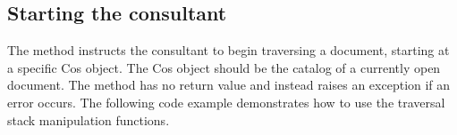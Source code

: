 \documentclass[letterpaper,12pt,english,openany,oneside]{sphinxmanual}
\begin{document}
\begin{sphinxVerbatim}[commandchars=\\\{\}]
             
              
            
            


    
             
   
\end{sphinxVerbatim}


\subsection{Starting the consultant}
\label{\detokenize{Plugins_ExtendedAPI:starting-the-consultant}}
The  method instructs the consultant to begin traversing a document, starting at a specific Cos object. The Cos object should be the catalog of a currently open document. The  method has no return value and instead raises an exception if an error occurs. The following code example demonstrates how to use the traversal stack manipulation functions.
\end{document}
